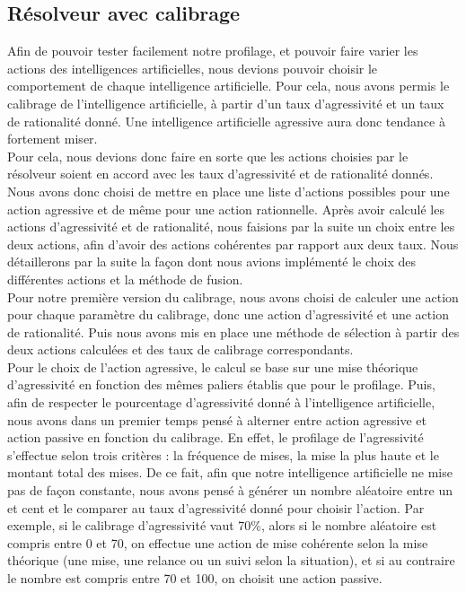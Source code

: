\documentclass{report}
\begin{document}
\subsection{Résolveur avec calibrage}

\hspace{0.5cm}Afin de pouvoir tester facilement notre profilage, et pouvoir faire varier les actions des intelligences artificielles, nous devions pouvoir choisir le comportement de chaque intelligence artificielle. Pour cela, nous avons permis le calibrage de l'intelligence artificielle, à partir d'un taux d'agressivité et un taux de rationalité donné. Une intelligence artificielle agressive aura donc tendance à fortement miser.\\

Pour cela, nous devions donc faire en sorte que les actions choisies par le résolveur soient en accord avec les taux d'agressivité et de rationalité donnés. Nous avons donc choisi de mettre en place une liste d'actions possibles pour une action agressive et de même pour une action rationnelle. Après avoir calculé les actions d'agressivité et de rationalité, nous faisions par la suite un choix entre les deux actions, afin d'avoir des actions cohérentes par rapport aux deux taux. Nous détaillerons par la suite la façon dont nous avions implémenté le choix des différentes actions et la méthode de fusion.\\

Pour notre première version du calibrage, nous avons choisi de calculer une action pour chaque paramètre du calibrage, donc une action d'agressivité et une action de rationalité. Puis nous avons mis en place une méthode de sélection à partir des deux actions calculées et des taux de calibrage correspondants.\\

Pour le choix de l'action agressive, le calcul se base sur une mise théorique d'agressivité en fonction des mêmes paliers établis que pour le profilage. Puis, afin de respecter le pourcentage d'agressivité donné à l'intelligence artificielle, nous avons dans un premier temps pensé à alterner entre action agressive et action passive en fonction du calibrage. En effet, le profilage de l'agressivité s'effectue selon trois critères : la fréquence de mises, la mise la plus haute et le montant total des mises. De ce fait, afin que notre intelligence artificielle ne mise pas de façon constante, nous avons pensé à générer un nombre aléatoire entre un et cent et le comparer au taux d'agressivité donné pour choisir l'action. Par exemple, si le calibrage d'agressivité vaut 70\%, alors si le nombre aléatoire est compris entre 0 et 70, on effectue une action de mise cohérente selon la mise théorique (une mise, une relance ou un suivi selon la situation), et si au contraire le nombre est compris entre 70 et 100, on choisit une action passive.\\
\end{document}
